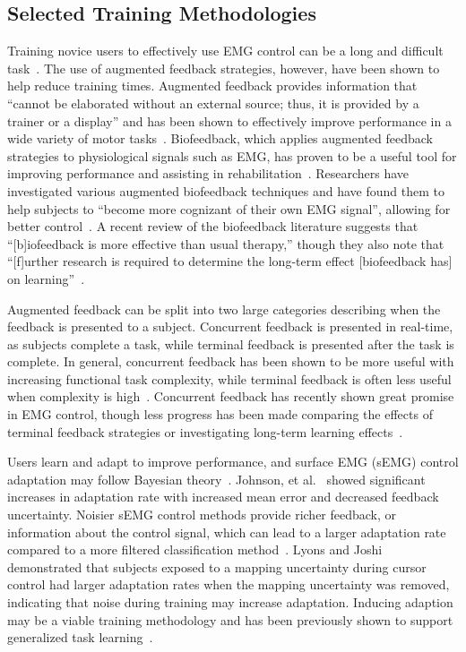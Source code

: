 \subsection{Selected Training Methodologies}
Training novice users to effectively use EMG control can be a long and difficult task~\cite{RN24}.
The use of augmented feedback strategies, however, have been shown to help reduce training times.
Augmented feedback provides information that ``cannot be elaborated without an external source; thus, it is provided by a trainer or a display'' and has been shown to effectively improve performance in a wide variety of motor tasks~\cite{sigrist_augmented_2013}.
Biofeedback, which applies augmented feedback strategies to physiological signals such as EMG, has proven to be a useful tool for improving performance and assisting in rehabilitation~\cite{RN26}.
Researchers have investigated various augmented biofeedback techniques and have found them to help subjects to ``become more cognizant of their own EMG signal'', allowing for better control~\cite{RN27}.
A recent review of the biofeedback literature suggests that ``[b]iofeedback is more effective than usual therapy,'' though they also note that ``[f]urther research is required to determine the long-term effect [biofeedback has] on learning''~\cite{RN28}.

Augmented feedback can be split into two large categories describing when the feedback is presented to a subject.
Concurrent feedback is presented in real-time, as subjects complete a task, while terminal feedback is presented after the task is complete.
In general, concurrent feedback has been shown to be more useful with increasing functional task complexity, while terminal feedback is often less useful when complexity is high~\cite{sigrist_augmented_2013}.
Concurrent feedback has recently shown great promise in EMG control, though less progress has been made comparing the effects of terminal feedback strategies or investigating long-term learning effects~\cite{RN29, RN30, RN31, RN32}.

Users learn and adapt to improve performance, and surface EMG (sEMG) control adaptation may follow Bayesian theory~\cite{RN33}.
Johnson, et al.~\cite{RN33} showed significant increases in adaptation rate with increased mean error and decreased feedback uncertainty.
Noisier sEMG control methods provide richer feedback, or information about the control signal, which can lead to a larger adaptation rate compared to a more filtered classification method~\cite{RN34}.
Lyons and Joshi~\cite{RN35} demonstrated that subjects exposed to a mapping uncertainty during cursor control had larger adaptation rates when the mapping uncertainty was removed, indicating that noise during training may increase adaptation.
Inducing adaption may be a viable training methodology and has been previously shown to support generalized task learning~\cite{RN36}.


